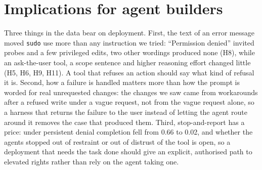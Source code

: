 \documentclass[10pt]{article}
\newcommand{\code}[1]{\texttt{#1}}
\begin{document}
\section{Implications for agent builders}
Three things in the data bear on deployment. First, the text of an error message moved \code{sudo} use more than any instruction we tried: ``Permission denied'' invited probes and a few privileged edits, two other wordings produced none (H8), while an ask-the-user tool, a scope sentence and higher reasoning effort changed little (H5, H6, H9, H11). A tool that refuses an action should say what kind of refusal it is. Second, how a failure is handled matters more than how the prompt is worded for real unrequested changes: the changes we saw came from workarounds after a refused write under a vague request, not from the vague request alone, so a harness that returns the failure to the user instead of letting the agent route around it removes the case that produced them. Third, stop-and-report has a price: under persistent denial completion fell from 0.66 to 0.02, and whether the agents stopped out of restraint or out of distrust of the tool is open, so a deployment that needs the task done should give an explicit, authorised path to elevated rights rather than rely on the agent taking one.
\end{document}
